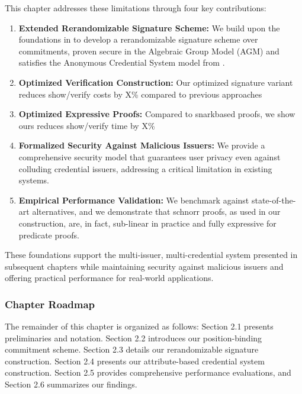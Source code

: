 This chapter addresses these limitations through four key contributions:
\begin{enumerate}
    \item \textbf{Extended Rerandomizable Signature Scheme:} We build upon the foundations in \cite{utt} to develop a rerandomizable signature scheme over commitments, proven secure in the Algebraic Group Model (AGM) and satisfies the Anonymous Credential System model from \cite{fuchsbauer_structure-preserving_2019}.
    
    \item \textbf{Optimized Verification Construction:} Our optimized signature variant reduces show/verify costs by X\% compared to previous approaches

    \item \textbf{Optimized Expressive Proofs:} Compared to snarkbased proofs, we show ours reduces show/verify time by X\%
    
    \item \textbf{Formalized Security Against Malicious Issuers:} We provide a comprehensive security model that guarantees user privacy even against colluding credential issuers, addressing a critical limitation in existing systems.
    
    \item \textbf{Empirical Performance Validation:} We benchmark against state-of-the-art alternatives, and we demonstrate that schnorr proofs, as used in our construction, are, in fact, sub-linear in practice and fully expressive for predicate proofs.
\end{enumerate}

These foundations support the multi-issuer, multi-credential system presented in subsequent chapters while maintaining security against malicious issuers and offering practical performance for real-world applications.


\subsubsection*{Chapter Roadmap}
The remainder of this chapter is organized as follows: Section 2.1 presents preliminaries and notation. Section 2.2 introduces our position-binding commitment scheme. Section 2.3 details our rerandomizable signature construction. Section 2.4 presents our attribute-based credential system construction. Section 2.5 provides comprehensive performance evaluations, and Section 2.6 summarizes our findings.


















